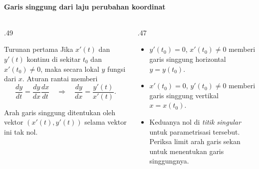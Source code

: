 \documentclass{../../kalkulus-ppt}
\begin{document}
\begin{frame}{\insertsection}
    \framesubtitle{Garis singgung dari laju perubahan koordinat}
    \begin{columns}[c,onlytextwidth]
        \begin{column}{.49\textwidth}
            \begin{block}{Turunan pertama}
                Jika $x'(t)$ dan $y'(t)$ kontinu di sekitar $t_0$
                dan $x'(t_0)\ne0$, maka secara lokal $y$ fungsi
                dari $x$. Aturan rantai memberi
                \[
                    \frac{dy}{dt}=\frac{dy}{dx}\frac{dx}{dt}
                    \quad\Longrightarrow\quad
                    \frac{dy}{dx}=\frac{y'(t)}{x'(t)}.
                \]
            \end{block}
            Arah garis singgung ditentukan oleh vektor
            $(x'(t),y'(t))$ selama vektor ini tak nol.
        \end{column}
        \begin{column}{.47\textwidth}
            \begin{itemize}
                \item $y'(t_0)=0$, $x'(t_0)\ne0$ memberi
                garis singgung horizontal $y=y(t_0)$.
                \item $x'(t_0)=0$, $y'(t_0)\ne0$ memberi
                garis singgung vertikal $x=x(t_0)$.
                \item Keduanya nol di \emph{titik singular}
                untuk parametrisasi tersebut. Periksa limit arah
                garis sekan untuk menentukan garis singgungnya.
            \end{itemize}
        \end{column}
    \end{columns}
\end{frame}
\end{document}
